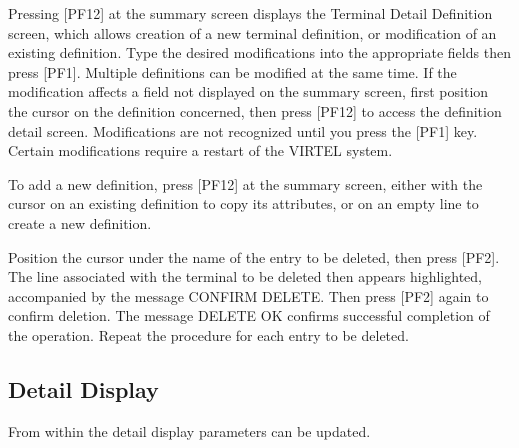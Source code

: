 \documentclass[letterpaper,10pt,english]{sphinxmanual}
\begin{document}
\sphinxAtStartPar
{} \sphinxhyphen{} Pressing {[}PF12{]} at the summary screen displays the Terminal Detail Definition screen, which allows creation of a new terminal definition, or modification of an existing definition. Type the desired modifications into the appropriate fields then press {[}PF1{]}. Multiple definitions can be modified at the same time. If the modification affects a field not displayed on the summary screen, first position the cursor on the definition concerned, then press {[}PF12{]} to access the definition detail screen. Modifications are not recognized until you press the {[}PF1{]} key. Certain modifications require a restart of the VIRTEL
system.

\sphinxAtStartPar
{} \sphinxhyphen{} To add a new definition, press {[}PF12{]} at the summary screen, either with the cursor on an existing definition to copy its attributes, or on an empty line to create a new definition.

\sphinxAtStartPar
{} \sphinxhyphen{} Position the cursor under the name of the entry to be deleted, then press {[}PF2{]}. The line associated with the terminal to be deleted then appears highlighted, accompanied by the message CONFIRM DELETE. Then press {[}PF2{]} again to confirm deletion. The message DELETE OK confirms successful completion of the operation. Repeat the procedure for each entry to be deleted.

\ignorespaces 

\subsection{Detail Display}
\label{\detokenize{connectivity_guide:index-102}}\label{\detokenize{connectivity_guide:id54}}
\sphinxAtStartPar
{}

\sphinxAtStartPar
From within the detail display parameters can be updated.

\ignorespaces 
\end{document}

